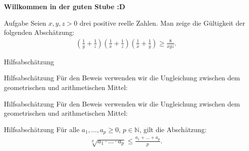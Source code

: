 \documentclass[10pt]{beamer}
\title{}
\author{Artur's \( \oint \) Mathematikstübchen}
\date{}
\def\bN{\mathbb{N}}
\begin{document}

\begin{frame}
    \begin{center}
        \textbf{\huge Willkommen in der guten Stube \newline \newline :D}
    \end{center}
\end{frame}




\begin{frame}
    \begin{alertblock}{Aufgabe}
        Seien \( x, y, z > 0 \) drei positive reelle Zahlen. Man zeige die Gültigkeit der folgenden Abschätzung:
        \begin{align*}
            \left( \frac{1}{y} + \frac{1}{z} \right) \left( \frac{1}{x} + \frac{1}{z} \right) \left( \frac{1}{x} + \frac{1}{y} \right)
            \geq \frac{8}{xyz}.
        \end{align*}
    \end{alertblock}
\end{frame}



\begin{frame}{Hilfsabschätzung}
    
\end{frame}



\begin{frame}{Hilfsabschätzung}
    Für den Beweis verwenden wir die Ungleichung zwischen dem geometrischen und arithmetischen Mittel:
\end{frame}



\begin{frame}{Hilfsabschätzung}
    Für den Beweis verwenden wir die Ungleichung zwischen dem geometrischen und arithmetischen Mittel:
    \begin{block}{Hilfsabschätzung}
        Für alle \( a_{1}, \ldots, a_{p} \geq 0 \), \( p \in \bN \), gilt die Abschätzung:
        \begin{align*}
            \sqrt[p]{a_{1} \cdot \ldots \cdot a_{p}} 
            \leq \frac{a_{1} + \ldots + a_{p}}{p}.
        \end{align*}
    \end{block}
\end{frame}
\end{document}
